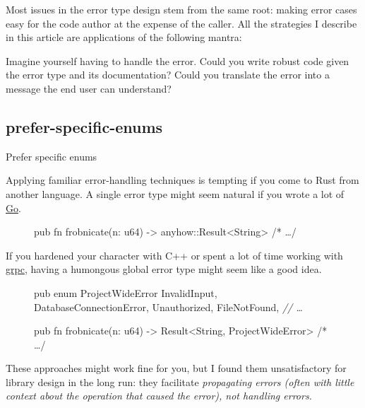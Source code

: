 \documentclass{article}
\begin{document}
Most issues in the error type design stem from the same root: making error cases easy for the code author at the expense of the caller.
All the strategies I describe in this article are applications of the following mantra:


Imagine yourself having to handle the error.
Could you write robust code given the error type and its documentation?
Could you translate the error into a message the end user can understand?

\subsection{prefer-specific-enums}{Prefer specific enums}

Applying familiar error-handling techniques is tempting if you come to Rust from another language.
A single error type might seem natural if you wrote a lot of \href{https://go.dev}{Go}.

\begin{figure}
\begin{code}[bad]
pub fn frobnicate(n: u64) -> anyhow::Result<String> { /* \ldots  */ }
\end{code}
\end{figure}

If you hardened your character with C++ or spent a lot of time working with \href{https://grpc.github.io/grpc/core/md_doc_statuscodes.html}{grpc}, having a humongous global error type might seem like a good idea.

\begin{figure}
\begin{code}[bad]
pub enum ProjectWideError {
  InvalidInput,
  DatabaseConnectionError,
  Unauthorized,
  FileNotFound,
  \em{// \ldots }
}

pub fn frobnicate(n: u64) -> Result<String, ProjectWideError> { /* \ldots  */ }
\end{code}
\end{figure}

These approaches might work fine for you, but I found them unsatisfactory for library design in the long run: they facilitate \em{propagating} errors (often with little context about the operation that caused the error), not \em{handling} errors.
\end{document}

